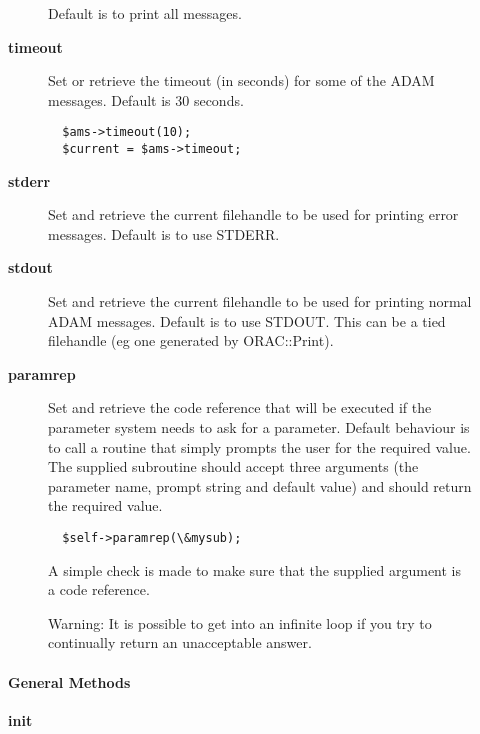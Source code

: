 \begin{description}
\begin{description}
Default is to print all messages.


\item[{\textbf{timeout}}] \mbox{}

Set or retrieve the timeout (in seconds) for some of the ADAM messages.
Default is 30 seconds.

\begin{verbatim}
  $ams->timeout(10);
  $current = $ams->timeout;
\end{verbatim}

\item[{\textbf{stderr}}] \mbox{}

Set and retrieve the current filehandle to be used for printing
error messages. Default is to use STDERR.


\item[{\textbf{stdout}}] \mbox{}

Set and retrieve the current filehandle to be used for printing
normal ADAM messages. Default is to use STDOUT. This can be
a tied filehandle (eg one generated by ORAC::Print).


\item[{\textbf{paramrep}}] \mbox{}

Set and retrieve the code reference that will be executed if
the parameter system needs to ask for a parameter.
Default behaviour is to call a routine that simply prompts
the user for the required value. The supplied subroutine
should accept three arguments (the parameter name, prompt string and
default value) and should return the required value.

\begin{verbatim}
  $self->paramrep(\&mysub);
\end{verbatim}


A simple check is made to make sure that the supplied argument
is a code reference.



Warning: It is possible to get into an infinite loop if you try
to continually return an unacceptable answer.

\end{description}
\paragraph*{General Methods\label{ORAC::Msg::Control::AMS_General_Methods}}
\begin{description}

\item[{\textbf{init}}] \mbox{}


\end{description}
\end{description}
